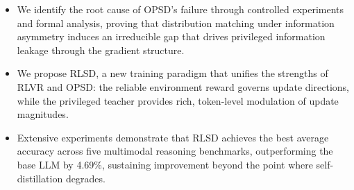 \documentclass[]{jingdong}
\begin{document}
 
\begin{itemize}[nosep]
    \item We identify the root cause of OPSD's failure through controlled experiments and formal analysis, proving that distribution matching under information asymmetry induces an irreducible gap that drives privileged information leakage through the gradient structure.
    \item We propose RLSD, a new training paradigm that unifies the strengths of RLVR and OPSD: the reliable environment reward governs update directions, while the privileged teacher provides rich, token-level modulation of update magnitudes.
    \item Extensive experiments demonstrate that RLSD achieves the best average accuracy across five multimodal reasoning benchmarks, outperforming the base LLM by 4.69\%, sustaining improvement beyond the point where self-distillation degrades.
\end{itemize}




\end{document}
